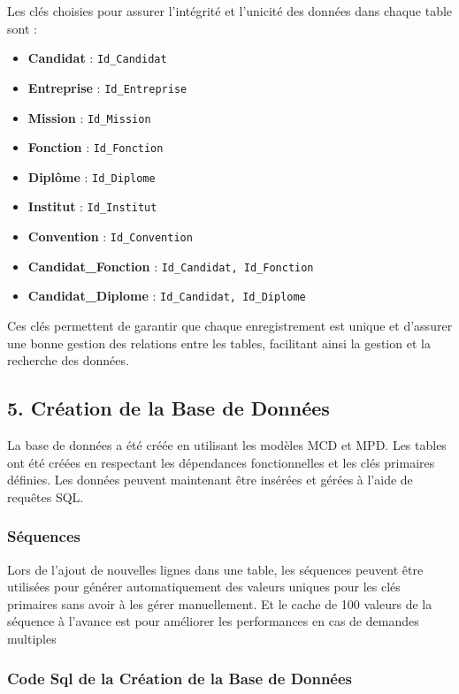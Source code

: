 \documentclass[a4paper,12pt]{article}
\begin{document}
\noindent
Les clés choisies pour assurer l'intégrité et l'unicité des données dans chaque table sont :
\begin{itemize}
    \item \textbf{Candidat} : \texttt{Id\_Candidat}
    \item \textbf{Entreprise} : \texttt{Id\_Entreprise}
    \item \textbf{Mission} : \texttt{Id\_Mission}
    \item \textbf{Fonction} : \texttt{Id\_Fonction}
    \item \textbf{Diplôme} : \texttt{Id\_Diplome}
    \item \textbf{Institut} : \texttt{Id\_Institut}
    \item \textbf{Convention} : \texttt{Id\_Convention}
    \item \textbf{Candidat\_Fonction} : \texttt{Id\_Candidat, Id\_Fonction}
    \item \textbf{Candidat\_Diplome} : \texttt{Id\_Candidat, Id\_Diplome}
\end{itemize}

Ces clés permettent de garantir que chaque enregistrement est unique et d'assurer une bonne gestion des relations entre les tables, facilitant ainsi la gestion et la recherche des données.


\subsection*{5. Création de la Base de Données}

La base de données a été créée en utilisant les modèles MCD et MPD. Les tables ont été créées en respectant les dépendances fonctionnelles et les clés primaires définies. Les données peuvent maintenant être insérées et gérées à l'aide de requêtes SQL.

\subsubsection*{Séquences }
Lors de l’ajout de nouvelles lignes dans une table, les séquences peuvent être utilisées pour générer automatiquement des valeurs uniques pour les clés primaires sans avoir à les gérer manuellement.
Et le cache  de 100 valeurs de la séquence à l’avance est pour améliorer les performances en cas de demandes multiples


\subsubsection*{Code Sql de la Création de la Base de Données}
\end{document}
